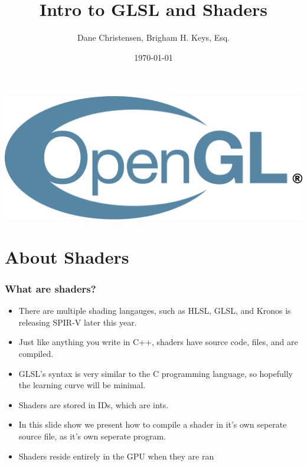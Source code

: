 \documentclass{beamer}
\title[GLSL Part 1]{Intro to GLSL and Shaders} %
\author{Dane Christensen, Brigham H. Keys, Esq.} %
\institute[BYU-Idaho] %
{
  Brigham Young University - Idaho\\
  \medskip
  \textit{bkeys@bkeys.org} %
}
\date{\today} %
\begin{document}
\begin{frame}

  \titlepage %
  \includegraphics[scale=.1]{../logo.png}
\end{frame}



\section{About Shaders}

\begin{frame}

  \frametitle{What are shaders?}

  \begin{itemize}
  \item There are multiple shading langauges, such as HLSL, GLSL, and Kronos is releasing SPIR-V later this year.
  \item Just like anything you write in C++, shaders have source code, files, and are compiled.
  \item GLSL's syntax is very similar to the C programming language, so hopefully the learning curve will be minimal.
  \item Shaders are stored in IDs, which are ints.
  \item In this slide show we present how to compile a shader in it's own seperate source file, as it's own seperate program.
  \item Shaders reside entirely in the GPU when they are ran
  \end{itemize}

\end{frame}
\end{document}
